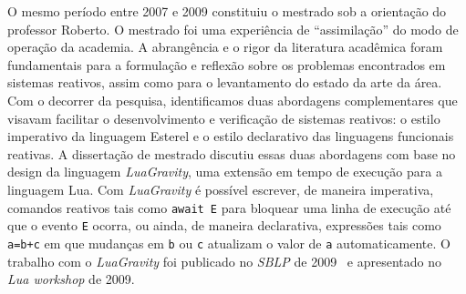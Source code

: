 \documentclass[12pt,a4paper]{article}
\newcommand{\code}[1] {{\small{\texttt{#1}}}}
\newcommand{\GVT}{\emph{LuaGravity}\xspace}
\begin{document}
O mesmo período entre 2007 e 2009 constituiu o mestrado sob a orientação do 
professor Roberto.
%
O mestrado foi uma experiência de ``assimilação'' do modo de operação da 
academia.
%
A abrangência e o rigor da literatura acadêmica foram fundamentais para a 
formulação e reflexão sobre os problemas encontrados em sistemas reativos, 
assim como para o levantamento do estado da arte da área.
%
Com o decorrer da pesquisa, identificamos duas abordagens complementares que 
visavam facilitar o desenvolvimento e verificação de sistemas reativos:
o estilo imperativo da linguagem Esterel e
o estilo declarativo das linguagens funcionais reativas.
%
A dissertação de mestrado discutiu essas duas abordagens com base no design da 
linguagem \GVT, uma extensão em tempo de execução para a linguagem Lua.
%
Com \GVT é possível escrever, de maneira imperativa, comandos reativos tais 
como \code{await E} para bloquear uma linha de execução até que o evento 
\code{E} ocorra, ou ainda, de maneira declarativa, expressões tais como 
\code{a=b+c} em que mudanças em \code{b} ou \code{c} atualizam o valor de 
\code{a} automaticamente.
%
O trabalho com o \GVT foi publicado no \emph{SBLP} de 
2009~\cite{luagravity.sblp} e apresentado no \emph{Lua workshop} de 2009.
\end{document}
